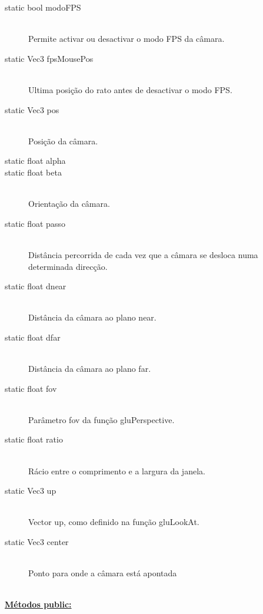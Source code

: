 \documentclass[a5paper,onecolumn, 11pt]{article}
\begin{document}
\begin{description}
	\item[static bool modoFPS] \hfill \\
	Permite activar ou desactivar o modo FPS da câmara.

	\item[static Vec3 fpsMousePos] \hfill \\
	Ultima posição do rato antes de desactivar o modo FPS.

	\item[static Vec3 pos] \hfill \\
	Posição da câmara.

	\item[static float alpha]
	\item[static float beta] \hfill \\
	Orientação da câmara.

	\item[static float passo] \hfill \\
	Distância percorrida de cada vez que a câmara se desloca numa determinada direcção.

	\item[static float dnear] \hfill \\
	Distância da câmara ao plano near.

	\item[static float dfar] \hfill \\
	Distância da câmara ao plano far.

	\item[static float fov] \hfill \\
	Parâmetro fov da função gluPerspective.

	\item[static float ratio] \hfill \\
	Rácio entre o comprimento e a largura da janela.

	\item[static Vec3 up] \hfill \\
	Vector up, como definido na função gluLookAt.

	\item[static Vec3 center] \hfill \\
	Ponto para onde a câmara está apontada
\end{description}

\hfill \\ \underline{\textbf{Métodos public:}}
\end{document}
